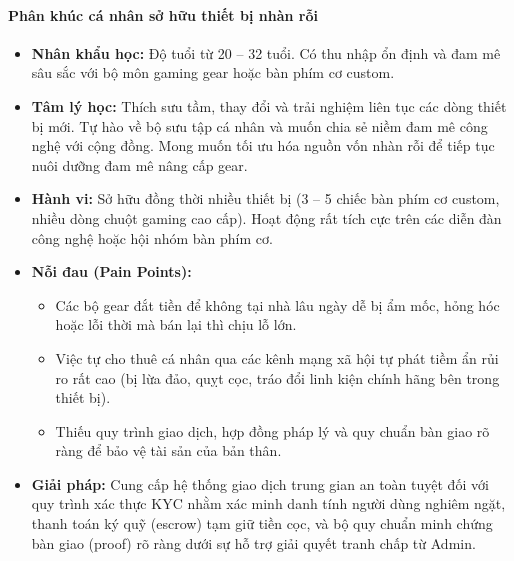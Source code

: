 \paragraph{Phân khúc cá nhân sở hữu thiết bị nhàn rỗi}
\begin{itemize}
    \item \textbf{Nhân khẩu học:} Độ tuổi từ 20 -- 32 tuổi. Có thu nhập ổn định và đam mê sâu sắc với bộ môn gaming gear hoặc bàn phím cơ custom.
    \item \textbf{Tâm lý học:} Thích sưu tầm, thay đổi và trải nghiệm liên tục các dòng thiết bị mới. Tự hào về bộ sưu tập cá nhân và muốn chia sẻ niềm đam mê công nghệ với cộng đồng. Mong muốn tối ưu hóa nguồn vốn nhàn rỗi để tiếp tục nuôi dưỡng đam mê nâng cấp gear.
    \item \textbf{Hành vi:} Sở hữu đồng thời nhiều thiết bị (3 -- 5 chiếc bàn phím cơ custom, nhiều dòng chuột gaming cao cấp). Hoạt động rất tích cực trên các diễn đàn công nghệ hoặc hội nhóm bàn phím cơ.
    \item \textbf{Nỗi đau (Pain Points):}
    \begin{itemize}
        \item Các bộ gear đắt tiền để không tại nhà lâu ngày dễ bị ẩm mốc, hỏng hóc hoặc lỗi thời mà bán lại thì chịu lỗ lớn.
        \item Việc tự cho thuê cá nhân qua các kênh mạng xã hội tự phát tiềm ẩn rủi ro rất cao (bị lừa đảo, quỵt cọc, tráo đổi linh kiện chính hãng bên trong thiết bị).
        \item Thiếu quy trình giao dịch, hợp đồng pháp lý và quy chuẩn bàn giao rõ ràng để bảo vệ tài sản của bản thân.
    \end{itemize}
    \item \textbf{Giải pháp:} Cung cấp hệ thống giao dịch trung gian an toàn tuyệt đối với quy trình xác thực KYC nhằm xác minh danh tính người dùng nghiêm ngặt, thanh toán ký quỹ (escrow) tạm giữ tiền cọc, và bộ quy chuẩn minh chứng bàn giao (proof) rõ ràng dưới sự hỗ trợ giải quyết tranh chấp từ Admin.
\end{itemize}

